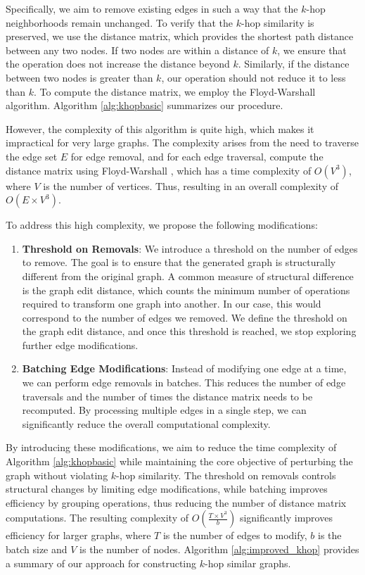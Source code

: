 Specifically, we aim to remove existing edges in such a way that the $k$-hop neighborhoods remain unchanged. To verify that the $k$-hop similarity is preserved, we use the distance matrix, which provides the shortest path distance between any two nodes. If two nodes are within a distance of $k$, we ensure that the operation does not increase the distance beyond $k$. Similarly, if the distance between two nodes is greater than $k$, our operation should not reduce it to less than $k$. To compute the distance matrix, we employ the Floyd-Warshall algorithm.  Algorithm \ref{alg:khopbasic} summarizes our procedure.

However, the complexity of this algorithm is quite high, which makes it impractical for very large graphs. The complexity arises from the need to traverse the edge set $E$ for edge removal, and for each edge traversal, compute the distance matrix using Floyd-Warshall \cite{floyd_warshall}, which has a time complexity of $O(V^3)$, where $V$ is the number of vertices. Thus, resulting in an overall complexity of $O(E \times V^3)$.

To address this high complexity, we propose the following modifications:

\begin{enumerate}
    \item \textbf{Threshold on Removals}: We introduce a threshold on the number of edges to remove. The goal is to ensure that the generated graph is structurally different from the original graph. A common measure of structural difference is the graph edit distance, which counts the minimum number of operations required to transform one graph into another. In our case, this would correspond to the number of edges we removed. We define the threshold on the graph edit distance, and once this threshold is reached, we stop exploring further edge modifications.

    \item \textbf{Batching Edge Modifications}: Instead of modifying one edge at a time, we can perform edge removals in batches. This reduces the number of edge traversals and the number of times the distance matrix needs to be recomputed. By processing multiple edges in a single step, we can significantly reduce the overall computational complexity.
\end{enumerate}


By introducing these modifications, we aim to reduce the time complexity of Algorithm \ref{alg:khopbasic} while maintaining the core objective of perturbing the graph without violating $k$-hop similarity. The threshold on removals controls structural changes by limiting edge modifications, while batching improves efficiency by grouping operations, thus reducing the number of distance matrix computations. The resulting complexity of $O\left(\frac{T \times V^3}{b}\right)$ significantly improves efficiency for larger graphs, where $T$ is the number of edges to modify, $b$ is the batch size and $V$ is the number of nodes. Algorithm \ref{alg:improved_khop} provides a  summary of our approach for constructing $k$-hop similar graphs.


